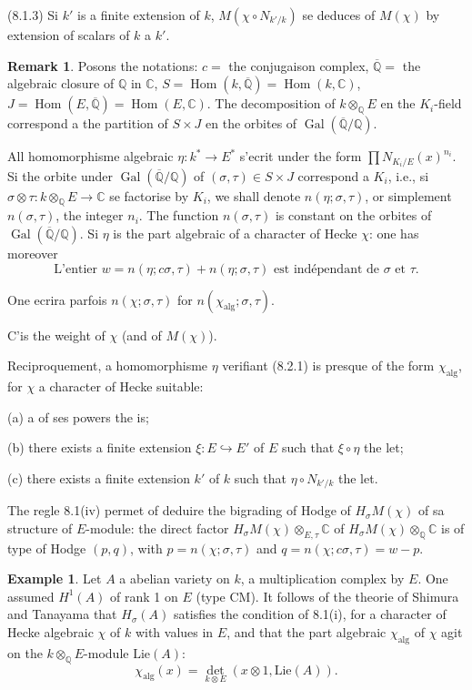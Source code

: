 \documentclass[12pt,a4paper]{article}
\theoremstyle{plain}
\theoremstyle{definition}
\newtheorem{remark}[definition]{Remark}
\newtheorem{example}[definition]{Example}
\theoremstyle{remark}
\DeclareMathOperator{\Hom}{Hom}
\DeclareMathOperator{\Gal}{Gal}
\newcommand{\Q}{\mathbb{Q}}
\newcommand{\C}{\mathbb{C}}
\begin{document}
(8.1.3) Si $k'$ is a finite extension of $k$, $M(\chi \circ N_{k'/k})$ se deduces of $M(\chi)$
by extension of scalars of $k$ a $k'$.

\begin{remark}
Posons the notations: $c =$ the conjugaison complex, $\overline{\Q} =$ the algebraic closure of
$\Q$ in $\C$, $S = \Hom(k, \overline{\Q}) = \Hom(k, \C)$, $J = \Hom(E, \overline{\Q}) = \Hom(E, \C)$. The
decomposition of $k \otimes_\Q E$ en the $K_i$-field correspond a the partition of
$S \times J$ en the orbites of $\Gal(\overline{\Q}/\Q)$.

All homomorphisme algebraic $\eta: k^* \to E^*$ s'ecrit under the form
$\prod N_{K_i/E}(x)^{n_i}$. Si the orbite under $\Gal(\overline{\Q}/\Q)$ of $(\sigma, \tau) \in S \times J$
correspond a $K_i$, i.e., si $\sigma \otimes \tau: k \otimes_\Q E \to \C$ se factorise by $K_i$,
we shall denote $n(\eta; \sigma, \tau)$, or simplement $n(\sigma, \tau)$, the integer $n_i$. The function
$n(\sigma, \tau)$ is constant on the orbites of $\Gal(\overline{\Q}/\Q)$. Si $\eta$ is the part
algebraic of a character of Hecke $\chi$: one has moreover
\begin{equation}\label{eq:8.2.1}
\text{L'entier } w = n(\eta; c\sigma, \tau) + n(\eta; \sigma, \tau) \text{ est ind\'ependant de } \sigma \text{ et } \tau.
\end{equation}

One ecrira parfois $n(\chi; \sigma, \tau)$ for $n(\chi_{\text{alg}}; \sigma, \tau)$.

C'is the weight of $\chi$ (and of $M(\chi)$).

Reciproquement, a homomorphisme $\eta$ verifiant (8.2.1) is presque of the form
$\chi_{\text{alg}}$, for $\chi$ a character of Hecke suitable:

(a) a of ses powers the is;

(b) there exists a finite extension $\xi: E \hookrightarrow E'$ of $E$ such that $\xi \circ \eta$ the let;

(c) there exists a finite extension $k'$ of $k$ such that $\eta \circ N_{k'/k}$ the let.

The regle 8.1(iv) permet of deduire the bigrading of Hodge of $H_\sigma M(\chi)$ of sa
structure of $E$-module: the direct factor $H_\sigma M(\chi) \otimes_{E,\tau} \C$ of
$H_\sigma M(\chi) \otimes_\Q \C$ is of type of Hodge $(p,q)$, with
$p = n(\chi; \sigma, \tau)$ and $q = n(\chi; c\sigma, \tau) = w - p$.
\end{remark}


\begin{example}
Let $A$ a abelian variety on $k$, a multiplication complex by $E$. One assumed
$H^1(A)$ of rank 1 on $E$ (type CM). It follows of the theorie of Shimura and
Tanayama that $H_\sigma(A)$ satisfies the condition of 8.1(i), for a character of Hecke
algebraic $\chi$ of $k$ with values in $E$, and that the part algebraic $\chi_{\text{alg}}$ of $\chi$
agit on the $k \otimes_\Q E$-module $\text{Lie}(A)$:
\[
\chi_{\text{alg}}(x) = \det_{k \otimes E}(x \otimes 1, \text{Lie}(A)).
\]
\end{example}
\end{document}
